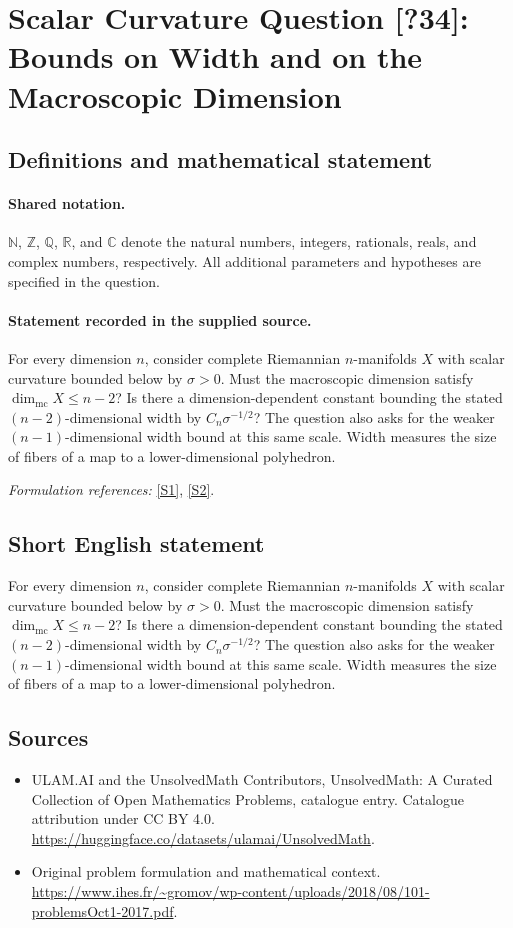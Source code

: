 \documentclass[11pt]{article}
\newcommand{\sref}[2]{\hyperlink{source:#1:#2}{[S#2]}}
\begin{document}
\section{Scalar Curvature Question [?34]: Bounds on Width and on the Macroscopic Dimension}\label{statement}

\subsection{Definitions and mathematical statement}

\paragraph{Shared notation.}$\mathbb N$, $\mathbb Z$, $\mathbb Q$, $\mathbb R$, and $\mathbb C$ denote the natural numbers, integers, rationals, reals, and complex numbers, respectively. All additional parameters and hypotheses are specified in the question.


\paragraph{Statement recorded in the supplied source.}
For every dimension $n$, consider complete Riemannian $n$-manifolds $X$ with scalar curvature bounded below by $\sigma>0$. Must the macroscopic dimension satisfy $\dim_{\mathrm{mc}}X\leq n-2$? Is there a dimension-dependent constant bounding the stated $(n-2)$-dimensional width by $C_n\sigma^{-1/2}$? The question also asks for the weaker $(n-1)$-dimensional width bound at this same scale. Width measures the size of fibers of a map to a lower-dimensional polyhedron.
\par\smallskip\textit{Formulation references:} \sref{statement}{1}, \sref{statement}{2}.
\subsection{Short English statement}
For every dimension $n$, consider complete Riemannian $n$-manifolds $X$ with scalar curvature bounded below by $\sigma>0$. Must the macroscopic dimension satisfy $\dim_{\mathrm{mc}}X\leq n-2$? Is there a dimension-dependent constant bounding the stated $(n-2)$-dimensional width by $C_n\sigma^{-1/2}$? The question also asks for the weaker $(n-1)$-dimensional width bound at this same scale. Width measures the size of fibers of a map to a lower-dimensional polyhedron.
\subsection{Sources}
\begin{itemize}
\item[\hypertarget{source:statement:1}{S1}] ULAM.AI and the UnsolvedMath Contributors, UnsolvedMath: A Curated Collection of Open Mathematics Problems, catalogue entry. Catalogue attribution under CC BY 4.0.
\url{https://huggingface.co/datasets/ulamai/UnsolvedMath}.
\item[\hypertarget{source:statement:2}{S2}] Original problem formulation and mathematical context.
\url{https://www.ihes.fr/~gromov/wp-content/uploads/2018/08/101-problemsOct1-2017.pdf}.
\end{itemize}
\label{end:statement}
\end{document}
